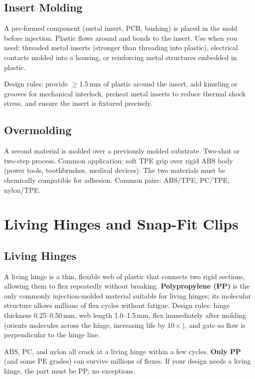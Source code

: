 \subsection{Insert Molding}
A pre-formed component (metal insert, PCB, bushing) is placed in the mold before injection. Plastic flows around and bonds to the insert. Use when you need: threaded metal inserts (stronger than threading into plastic), electrical contacts molded into a housing, or reinforcing metal structures embedded in plastic.

Design rules: provide $\geq$1.5\,mm of plastic around the insert, add knurling or grooves for mechanical interlock, preheat metal inserts to reduce thermal shock stress, and ensure the insert is fixtured precisely.

\subsection{Overmolding}
A second material is molded over a previously molded substrate. Two-shot or two-step process. Common application: soft TPE grip over rigid ABS body (power tools, toothbrushes, medical devices). The two materials must be chemically compatible for adhesion. Common pairs: ABS/TPE, PC/TPE, nylon/TPE.

\section{Living Hinges and Snap-Fit Clips}
\subsection{Living Hinges}
A living hinge is a thin, flexible web of plastic that connects two rigid sections, allowing them to flex repeatedly without breaking. \textbf{Polypropylene (PP)} is the only commonly injection-molded material suitable for living hinges; its molecular structure allows millions of flex cycles without fatigue. Design rules: hinge thickness 0.25--0.50\,mm, web length 1.0--1.5\,mm, flex immediately after molding (orients molecules across the hinge, increasing life by $10\times$), and gate so flow is perpendicular to the hinge line.

\begin{tipbox}
ABS, PC, and nylon all crack at a living hinge within a few cycles. \textbf{Only PP} (and some PE grades) can survive millions of flexes. If your design needs a living hinge, the part must be PP; no exceptions.
\end{tipbox}

